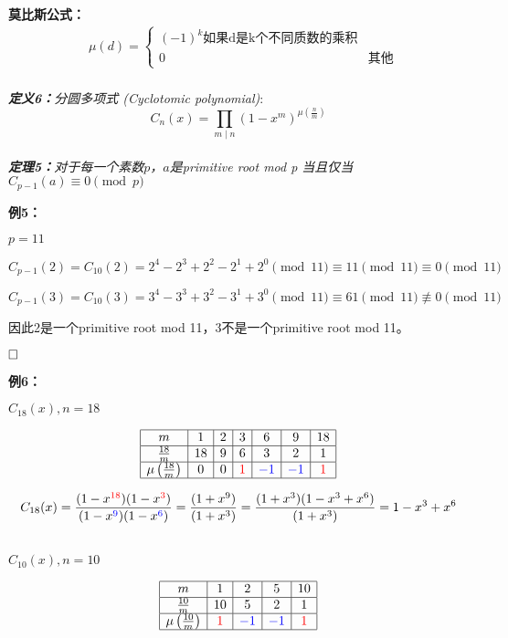 \documentclass{article}
\begin{document}
\textbf{莫比斯公式：}
$$
\begin{aligned}
&\mu(d)=\left\{\begin{array}{ll}
(-1)^{k} \mbox{如果d是k个不同质数的乘积} \\
0 & \mbox{其他} 
\end{array}\right.\\
\end{aligned}
$$

\textit{\textbf{定义6：}分圆多项式 (Cyclotomic polynomial)}:
$$
C_{n}(x)=\prod_{m \mid n}\left(1-x^{m}\right)^{\mu\left(\frac{n}{m}\right)}
$$
~\\



\textit{\textbf{定理5：}对于每一个素数$p$，$a$是{\color{red}primitive root mod p} 当且仅当$C_{p-1}(a) \equiv 0 \pmod{p}$ }

\textbf{例5：}

$p = 11$

$$C_{p-1}(2) = C_{10}(2) = 2^4- 2^3 +2^2-2^1+2^0 \pmod{11} \equiv 11 \pmod{11} \equiv 0 \pmod{11}$$

$$C_{p-1}(3) = C_{10}(3) = 3^4- 3^3 +3^2-3^1+3^0 \pmod{11} \equiv 61 \pmod{11} \not\equiv 0 \pmod{11}$$


因此2是一个{\color{red}primitive root mod 11}，3不是一个{\color{red}primitive root mod 11}。

$\hfill\square$ 


\textbf{例6：}


$C_{18}(x), n = 18$

$$
\begin{array}{|c|c|c|c|c|c|c|}
\hline 
m & 1 & 2& 3 &6&9&18 \\
\hline 
\frac{18}{m} &18&9&6&3&2&1  \\
\hline 
\mu\left(\frac{18}{m} \right) &0&0&{\color{red}1}&{\color{blue}-1}&{\color{blue}-1}&{\color{red}1} \\
\hline
\end{array}
$$

$$C_{18}(x) =\frac{(1-x^{{\color{red}18}})(1-x^{{\color{red}3}})}{(1-x^{{\color{blue}9}})(1-x^{{\color{blue}6}})} = \frac{(1+x^{9})}{(1+x^3)} =\frac{(1+x^{3})(1-x^{3}+x^{6})}{(1+x^3)}  = 1 - x^3+x^6$$

~\\

$C_{10}(x), n = 10$

$$
\begin{array}{|c|c|c|c|c|}
\hline 
m & 1 & 2& 5&10\\
\hline 
\frac{10}{m} &10&5&2&1\\
\hline 
\mu\left(\frac{10}{m} \right) &{\color{red}1}&{\color{blue}-1}&{\color{blue}-1}&{\color{red}1}\\
\hline
\end{array}
$$
\end{document}
